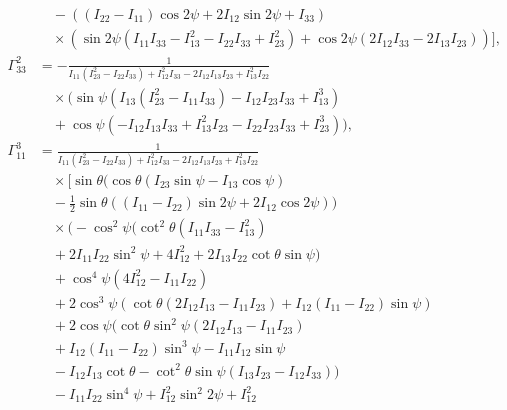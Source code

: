 \documentclass[pdflatex,sn-mathphys-num]{sn-jnl}%
\theoremstyle{thmstyleone}%
\theoremstyle{thmstyletwo}%
\theoremstyle{thmstylethree}%
\begin{document}
\begin{appendices}
\begin{align}
    &\quad -((I_{22}-I_{11}) \cos 2\psi+2 I_{12} \sin 2\psi+I_{33}) \nonumber \\
    &\quad \times \left(\sin 2\psi \left(I_{11} I_{33}-I_{13}^2-I_{22} I_{33}+I_{23}^2\right)+\cos 2\psi (2 I_{12} I_{33}-2 I_{13} I_{23})\right) \bigg], \nonumber \\
    \Gamma^{2}_{33} &= -\frac{1}{I_{11} \left(I_{23}^2-I_{22} I_{33}\right)+I_{12}^2 I_{33}-2 I_{12} I_{13} I_{23}+I_{13}^2 I_{22}} \nonumber \\
    &\quad \times \Big( \sin \psi \left(I_{13} \left(I_{23}^2-I_{11} I_{33}\right)-I_{12} I_{23} I_{33}+I_{13}^3\right) \nonumber \\
    &\quad + \cos \psi \left(-I_{12} I_{13} I_{33}+I_{13}^2 I_{23}-I_{22} I_{23} I_{33}+I_{23}^3\right) \Big), \nonumber \\
    \Gamma^{3}_{11} &= \frac{1}{I_{11} \left(I_{23}^2-I_{22} I_{33}\right)+I_{12}^2 I_{33}-2 I_{12} I_{13} I_{23}+I_{13}^2 I_{22}} \nonumber \\
    &\quad \times \bigg[ \sin \theta \bigg(\cos \theta (I_{23} \sin \psi-I_{13} \cos \psi) \nonumber \\
    &\quad -\frac{1}{2} \sin \theta ((I_{11}-I_{22}) \sin 2\psi+2 I_{12} \cos 2\psi)\bigg) \nonumber \\
    &\quad \times \bigg(-\cos ^2\psi \Big(\cot ^2\theta \left(I_{11} I_{33}-I_{13}^2\right) \nonumber \\
    &\quad +2 I_{11} I_{22} \sin ^2\psi+4 I_{12}^2+2 I_{13} I_{22} \cot \theta \sin \psi\Big) \nonumber \\
    &\quad +\cos ^4\psi \left(4 I_{12}^2-I_{11} I_{22}\right) \nonumber \\
    &\quad +2 \cos ^3\psi (\cot \theta (2 I_{12} I_{13}-I_{11} I_{23})+I_{12} (I_{11}-I_{22}) \sin \psi) \nonumber \\
    &\quad +2 \cos \psi \Big(\cot \theta \sin ^2\psi (2 I_{12} I_{13}-I_{11} I_{23}) \nonumber \\
    &\quad +I_{12} (I_{11}-I_{22}) \sin ^3\psi -I_{11} I_{12} \sin \psi \nonumber \\
    &\quad -I_{12} I_{13} \cot \theta-\cot ^2\theta \sin \psi (I_{13} I_{23}-I_{12} I_{33})\Big) \nonumber \\
    &\quad -I_{11} I_{22} \sin ^4\psi+I_{12}^2 \sin ^2 2\psi+I_{12}^2 \nonumber \\

\end{align}
\end{appendices}
\end{document}
